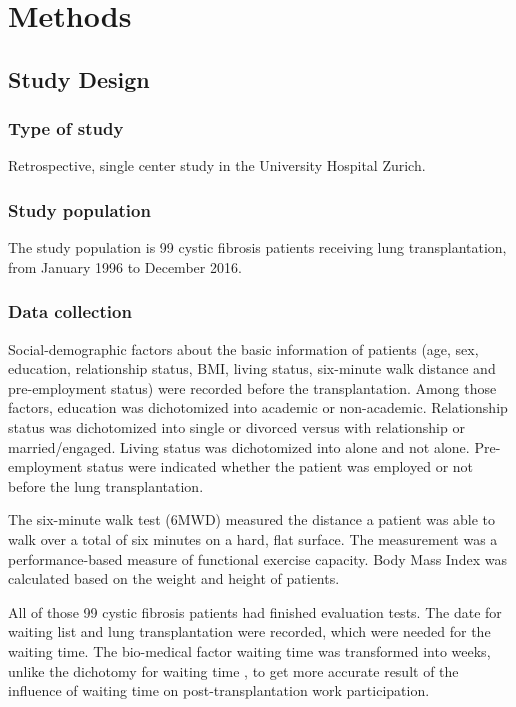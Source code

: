 \documentclass[11pt, a4paper]{article}\usepackage[]{graphicx}\usepackage[]{color}
\begin{document}
\section{Methods} \label{sec:methods}

\subsection*{Study Design} \label{subsec:design}
\vspace{0.5cm}
\subsubsection*{Type of study}
Retrospective, single center study in the University Hospital Zurich.

\vspace{0.5cm}
\subsubsection*{Study population}
The study population is  99 cystic fibrosis patients receiving lung transplantation, from January 1996 to December 2016.

\vspace{0.5cm}
\subsubsection*{Data collection} 
\label{sec:datacollect}
Social-demographic factors about the basic information of patients (age, sex, education, relationship status, BMI, living status, six-minute walk distance and pre-employment status) were recorded before the transplantation. Among those factors, education was dichotomized into academic or non-academic. Relationship status was dichotomized into single or divorced versus with relationship or married/engaged. Living status was dichotomized into alone and not alone. Pre-employment status were indicated whether the patient was employed or not before the lung transplantation. 

The six-minute walk test (6MWD) measured the distance a patient was able to walk over a total of six minutes on a hard, flat surface. The measurement was a performance-based measure of functional exercise capacity. Body Mass Index was calculated based on the weight and height of patients.


All of those 99 cystic fibrosis patients had finished evaluation tests. The date for waiting list and lung transplantation were recorded, which were needed for the waiting time. The bio-medical factor waiting time was transformed into weeks, unlike the dichotomy for waiting time \cite{laborde2012employment}, to get more accurate result of the influence of waiting time on post-transplantation work participation. 
\end{document}
